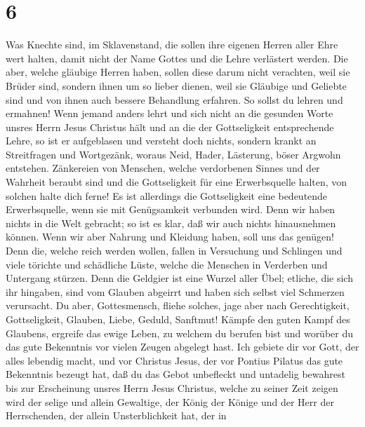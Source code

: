 \hypertarget{section-5}{%
\section{6}\label{section-5}}

 Was Knechte sind, im Sklavenstand, die sollen ihre
eigenen Herren aller Ehre wert halten, damit nicht der Name Gottes und
die Lehre verlästert werden.  Die aber, welche gläubige
Herren haben, sollen diese darum nicht verachten, weil sie Brüder sind,
sondern ihnen um so lieber dienen, weil sie Gläubige und Geliebte sind
und von ihnen auch bessere Behandlung erfahren. So sollst du lehren und
ermahnen!  Wenn jemand anders lehrt und sich nicht an die
gesunden Worte unsres Herrn Jesus Christus hält und an die der
Gottseligkeit entsprechende Lehre,  so ist er aufgeblasen
und versteht doch nichts, sondern krankt an Streitfragen und Wortgezänk,
woraus Neid, Hader, Lästerung, böser Argwohn entstehen. 
Zänkereien von Menschen, welche verdorbenen Sinnes und der Wahrheit
beraubt sind und die Gottseligkeit für eine Erwerbsquelle halten, von
solchen halte dich ferne!  Es ist allerdings die
Gottseligkeit eine bedeutende Erwerbsquelle, wenn sie mit Genügsamkeit
verbunden wird.  Denn wir haben nichts in die Welt
gebracht; so ist es klar, daß wir auch nichts hinausnehmen können.
 Wenn wir aber Nahrung und Kleidung haben, soll uns das
genügen!  Denn die, welche reich werden wollen, fallen in
Versuchung und Schlingen und viele törichte und schädliche Lüste, welche
die Menschen in Verderben und Untergang stürzen.  Denn
die Geldgier ist eine Wurzel aller Übel; etliche, die sich ihr hingaben,
sind vom Glauben abgeirrt und haben sich selbst viel Schmerzen
verursacht.  Du aber, Gottesmensch, fliehe solches, jage
aber nach Gerechtigkeit, Gottseligkeit, Glauben, Liebe, Geduld,
Sanftmut!  Kämpfe den guten Kampf des Glaubens, ergreife
das ewige Leben, zu welchem du berufen bist und worüber du das gute
Bekenntnis vor vielen Zeugen abgelegt hast.  Ich gebiete
dir vor Gott, der alles lebendig macht, und vor Christus Jesus, der vor
Pontius Pilatus das gute Bekenntnis bezeugt hat,  daß du
das Gebot unbefleckt und untadelig bewahrest bis zur Erscheinung unsres
Herrn Jesus Christus,  welche zu seiner Zeit zeigen wird
der selige und allein Gewaltige, der König der Könige und der Herr der
Herrschenden,  der allein Unsterblichkeit hat, der in
